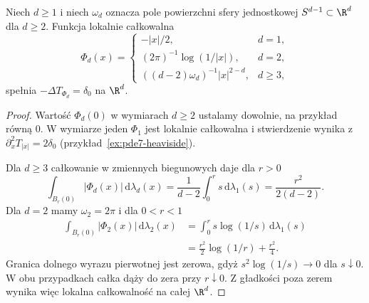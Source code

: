 \begin{twierdzenie}
\label{thm:pde7-laplace}
Niech $d\ge1$ i niech $\omega_d$ oznacza pole powierzchni
sfery jednostkowej $S^{d-1}\subset\R^d$ dla $d\ge2$.
Funkcja lokalnie całkowalna
\begin{equation}\label{eq:pde7-laplace-fundamental}
 \Phi_d(x)=\begin{cases}
 -|x|/2,&d=1,\\
 (2\pi)^{-1}\log(1/|x|),&d=2,\\
 ((d-2)\omega_d)^{-1}|x|^{2-d},&d\ge3,
 \end{cases}
\end{equation}
spełnia $-\Delta T_{\Phi_d}=\delta_0$ na $\R^d$.
\end{twierdzenie}
\begin{proof}
Wartość $\Phi_d(0)$ w wymiarach $d\ge2$ ustalamy
dowolnie, na przykład równą $0$.
W wymiarze jeden $\Phi_1$ jest lokalnie całkowalna
i stwierdzenie wynika z $\partial_x^2T_{|x|}=2\delta_0$
(przykład~\ref{ex:pde7-heaviside}).

Dla $d\ge3$ całkowanie w zmiennych biegunowych daje
dla $r>0$
\[
 \int_{B_r(0)}|\Phi_d(x)|\,\mathrm d\lambda_d(x)
 =\frac1{d-2}\int_0^r s\,\mathrm d\lambda_1(s)
 =\frac{r^2}{2(d-2)}.
\]
Dla $d=2$ mamy $\omega_2=2\pi$ i dla $0<r<1$
\[
 \begin{aligned}
 \int_{B_r(0)}|\Phi_2(x)|\,\mathrm d\lambda_2(x)
 &=\int_0^r s\log(1/s)\,\mathrm d\lambda_1(s)\\
 &=\frac{r^2}{2}\log(1/r)+\frac{r^2}{4}.
 \end{aligned}
\]
Granica dolnego wyrazu pierwotnej jest zerowa,
gdyż $s^2\log(1/s)\to0$ dla $s\downarrow0$.
W obu przypadkach całka dąży do zera przy $r\downarrow0$.
Z gładkości poza zerem wynika więc lokalna
całkowalność na całej $\R^d$.


\end{proof}

